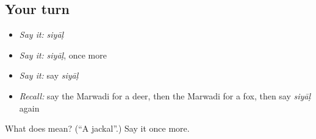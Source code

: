 \subsection*{Your turn}
\begin{itemize}
\raggedright
  \item \emph{Say it:} \emph{siyāḷ}
  \item \emph{Say it:} \emph{siyāḷ}, once more
  \item \emph{Say it:} say \emph{siyāḷ}
  \item \emph{Recall:} say the Marwadi for a deer, then the Marwadi for a fox, then say \emph{siyāḷ} again
\end{itemize}

\begin{tcolorbox}[breakable,colback=teal!4,colframe=teal!35!black,title={Before you move on}]
What does  mean? (\textquotedblleft{}A jackal\textquotedblright{}.) Say it once more.
\end{tcolorbox}
